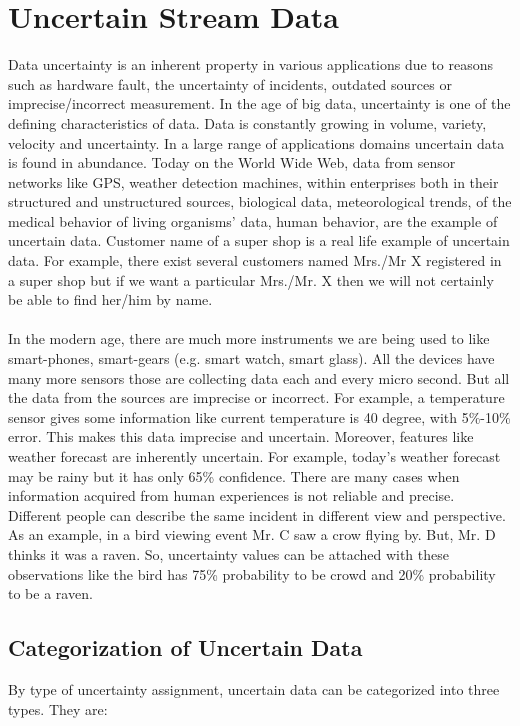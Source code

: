 \section{Uncertain Stream Data}
Data uncertainty is an inherent property in various applications due to reasons such as hardware fault, the uncertainty of incidents, outdated sources or imprecise/incorrect measurement. In the age of big data, uncertainty is one of the defining characteristics of data. Data is constantly growing in volume, variety, velocity and uncertainty. In a large range of applications domains uncertain data is found in abundance. Today on the World Wide Web, data from sensor networks like GPS, weather detection machines, within enterprises both in their structured and unstructured sources, biological data, meteorological trends, of the medical behavior of living organisms’ data, human behavior, are the example of uncertain data. Customer name of a super shop is a real life example of uncertain data. For example, there exist several customers named Mrs./Mr X registered in a super shop but if we want a particular Mrs./Mr. X then we will not certainly be able to find her/him by name.\\ \\
In the modern age, there are much more instruments we are being used to like smart-phones, smart-gears (e.g. smart watch, smart glass). All the devices have many more sensors those are collecting data each and every micro second. But all the data from the sources are imprecise or incorrect. For example, a temperature sensor gives some information like current temperature is 40 degree, with 5\%-10\% error. This makes this data imprecise and uncertain. Moreover, features like weather forecast are inherently uncertain. For example, today's weather forecast may be rainy but it has only 65\% confidence. There are many cases when information acquired from human experiences is not reliable and precise. Different people can describe the same incident in different view and perspective. As an example, in a bird viewing event Mr. C saw a crow flying by. But, Mr. D thinks it was a raven. So, uncertainty values can be attached with these observations like the bird has 75\% probability to be crowd and 20\% probability to be a raven.

\subsection{Categorization of Uncertain Data}
By type of uncertainty assignment, uncertain data can be categorized into three types. They are:
